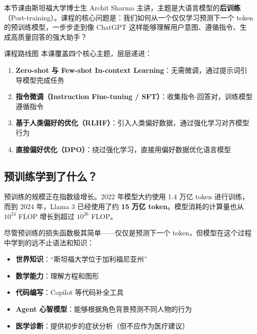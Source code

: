 \documentclass[a4paper]{article}
\begin{document}
本节课由斯坦福大学博士生 Archit Sharma 主讲，主题是大语言模型的\textbf{后训练}（Post-training）。课程的核心问题是：我们如何从一个仅仅学习预测下一个 token 的预训练模型，一步步走到像 ChatGPT 这样能够理解用户意图、遵循指令、生成高质量回答的强大助手？

\begin{importantbox}{课程路线图}
本课覆盖四个核心主题，层层递进：
\begin{enumerate}
    \item \textbf{Zero-shot 与 Few-shot In-context Learning}：无需微调，通过提示词引导模型完成任务
    \item \textbf{指令微调（Instruction Fine-tuning / SFT）}：收集指令-回答对，训练模型遵循指令
    \item \textbf{基于人类偏好的优化（RLHF）}：引入人类偏好数据，通过强化学习对齐模型行为
    \item \textbf{直接偏好优化（DPO）}：绕过强化学习，直接用偏好数据优化语言模型
\end{enumerate}
\end{importantbox}

\subsection{预训练学到了什么？}

预训练的规模正在指数级增长。2022 年模型大约使用 1.4 万亿 token 进行训练，而到 2024 年，Llama 3 已经使用了约 \textbf{15 万亿 token}。模型消耗的计算量也从 $10^{24}$ FLOP 增长到超过 $10^{26}$ FLOP。





尽管预训练的损失函数极其简单——仅仅是预测下一个 token，但模型在这个过程中学到的远不止语法和知识：

\begin{itemize}
    \item \textbf{世界知识}：``斯坦福大学位于加利福尼亚州''
    \item \textbf{数学能力}：理解方程和图形
    \item \textbf{代码编写}：Copilot 等代码补全工具
    \item \textbf{Agent 心智模型}：能够根据角色背景预测不同人物的行为
    \item \textbf{医学诊断}：提供初步的症状分析（但不应作为医疗建议）
\end{itemize}


\end{document}
